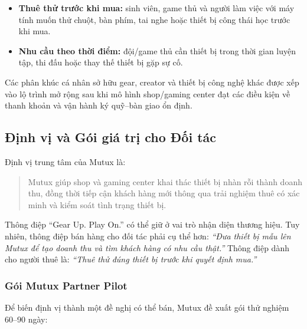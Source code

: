 \begin{itemize}
    \item \textbf{Thuê thử trước khi mua:} sinh viên, game thủ và người làm việc với máy tính muốn thử chuột, bàn phím, tai nghe hoặc thiết bị công thái học trước khi mua.
    \item \textbf{Nhu cầu theo thời điểm:} đội/game thủ cần thiết bị trong thời gian luyện tập, thi đấu hoặc thay thế thiết bị gặp sự cố.
\end{itemize}

Các phân khúc cá nhân sở hữu gear, creator và thiết bị công nghệ khác được xếp vào lộ trình mở rộng sau khi mô hình shop/gaming center đạt các điều kiện về thanh khoản và vận hành ký quỹ--bàn giao ổn định.

\subsection{Định vị và Gói giá trị cho Đối tác}

Định vị trung tâm của Mutux là:

\begin{quote}
    Mutux giúp shop và gaming center khai thác thiết bị nhàn rỗi thành doanh thu, đồng thời tiếp cận khách hàng mới thông qua trải nghiệm thuê có xác minh và kiểm soát tình trạng thiết bị.
\end{quote}

Thông điệp ``Gear Up. Play On.'' có thể giữ ở vai trò nhận diện thương hiệu. Tuy nhiên, thông điệp bán hàng cho đối tác phải cụ thể hơn: \textit{``Đưa thiết bị mẫu lên Mutux để tạo doanh thu và tìm khách hàng có nhu cầu thật.''} Thông điệp dành cho người thuê là: \textit{``Thuê thử đúng thiết bị trước khi quyết định mua.''}

\subsubsection{Gói Mutux Partner Pilot}

Để biến định vị thành một đề nghị có thể bán, Mutux đề xuất gói thử nghiệm 60--90 ngày:

